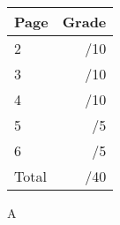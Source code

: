 \documentclass[12pt]{article}
\newcommand{\skipline}{\vspace{12pt}}
\begin{document}
\begin{table}[hbt]
\begin{center}
\begin{tabular}{|l|r|} \hline
Page&Grade\\
\hline \hline
\cline{1-2} 2 & \enspace\enspace\enspace\enspace\enspace\enspace/10\\
\cline{1-2} 3 & \enspace\enspace\enspace\enspace\enspace\enspace/10\\
\cline{1-2} 4 & \enspace\enspace\enspace\enspace\enspace\enspace/10\\
\cline{1-2} 5 & \enspace\enspace\enspace\enspace\enspace\enspace/5\\
\cline{1-2} 6 & \enspace\enspace\enspace\enspace\enspace\enspace/5\\
\cline{1-2} Total & \enspace\enspace\enspace\enspace\enspace\enspace/40\\
\hline
\end{tabular}

\skipline

\skipline

\skipline

A
\end{center}
\end{table}
\newpage
\end{document}
